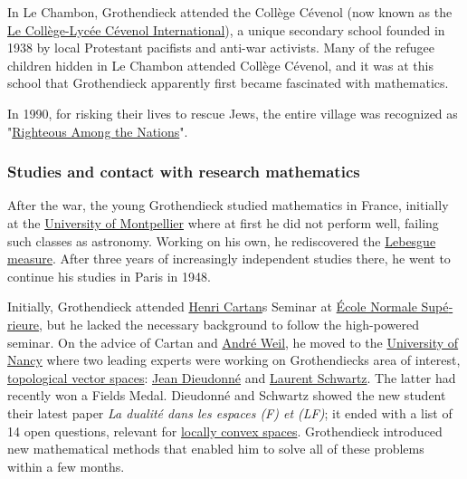 In Le Chambon, Grothendieck attended the Collège Cévenol (now known as the \href{https://en.wikipedia.org/wiki/Le_Collège-Lycée_Cévenol_International}{Le Collège-Lycée Cévenol International}), a unique secondary school founded in 1938 by local Protestant pacifists and anti-war activists. Many of the refugee children hidden in Le Chambon attended Collège Cévenol, and it was at this school that Grothendieck apparently first became fascinated with mathematics.

In 1990, for risking their lives to rescue Jews, the entire village was recognized as "\href{https://en.wikipedia.org/wiki/Righteous_Among_the_Nations}{Righteous Among the Nations}".


\subsubsection{Studies and contact with research mathematics}\label{Studies_and_contact_with_research_mathematics}

After the war, the young Grothendieck studied mathematics in France, initially at the \href{https://en.wikipedia.org/wiki/University_of_Montpellier}{University of Montpellier} where at first he did not perform well, failing such classes as astronomy. Working on his own, he rediscovered the \href{https://en.wikipedia.org/wiki/Lebesgue_measure}{Lebesgue measure}. After three years of increasingly independent studies there, he went to continue his studies in Paris in 1948.

Initially, Grothendieck attended \href{https://en.wikipedia.org/wiki/Henri_Cartan}{Henri Cartan}\textquotesingle s Seminar at {\foreignlanguage{french}{\href{https://en.wikipedia.org/wiki/École_Normale_Supérieure}{École Normale Supérieure}}}, but he lacked the necessary background to follow the high-powered seminar. On the advice of Cartan and \href{https://en.wikipedia.org/wiki/André_Weil}{André Weil}, he moved to the \href{https://en.wikipedia.org/wiki/University_of_Nancy}{University of Nancy} where two leading experts were working on Grothendieck\textquotesingle s area of interest, \href{https://en.wikipedia.org/wiki/Topological_vector_space}{topological vector spaces}: \href{https://en.wikipedia.org/wiki/Jean_Dieudonné}{Jean Dieudonné} and \href{https://en.wikipedia.org/wiki/Laurent_Schwartz}{Laurent Schwartz}. The latter had recently won a Fields Medal. Dieudonné and Schwartz showed the new student their latest paper \emph{La dualité dans les espaces ({F}) et ({LF})}; it ended with a list of 14 open questions, relevant for \href{https://en.wikipedia.org/wiki/Locally_convex_space}{locally convex spaces}. Grothendieck introduced new mathematical methods that enabled him to solve all of these problems within a few months.

